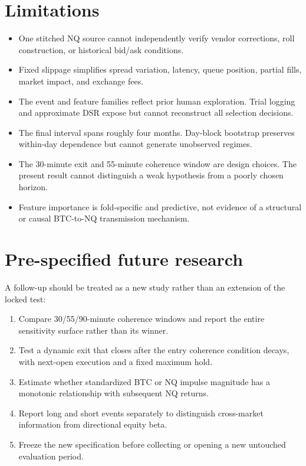 \documentclass[10pt]{article}
\begin{document}
\section{Limitations}
\begin{itemize}
  \item One stitched NQ source cannot independently verify vendor corrections, roll construction, or historical bid/ask conditions.
  \item Fixed slippage simplifies spread variation, latency, queue position, partial fills, market impact, and exchange fees.
  \item The event and feature families reflect prior human exploration. Trial logging and approximate DSR expose but cannot reconstruct all selection decisions.
  \item The final interval spans roughly four months. Day-block bootstrap preserves within-day dependence but cannot generate unobserved regimes.
  \item The 30-minute exit and 55-minute coherence window are design choices. The present result cannot distinguish a weak hypothesis from a poorly chosen horizon.
  \item Feature importance is fold-specific and predictive, not evidence of a structural or causal BTC-to-NQ transmission mechanism.
\end{itemize}

\newpage
\thispagestyle{fancy}
\section{Pre-specified future research}
A follow-up should be treated as a new study rather than an extension of the locked test:
\begin{enumerate}
  \item Compare 30/55/90-minute coherence windows and report the entire sensitivity surface rather than its winner.
  \item Test a dynamic exit that closes after the entry coherence condition decays, with next-open execution and a fixed maximum hold.
  \item Estimate whether standardized BTC or NQ impulse magnitude has a monotonic relationship with subsequent NQ returns.
  \item Report long and short events separately to distinguish cross-market information from directional equity beta.
  \item Freeze the new specification before collecting or opening a new untouched evaluation period.
\end{enumerate}
\end{document}
